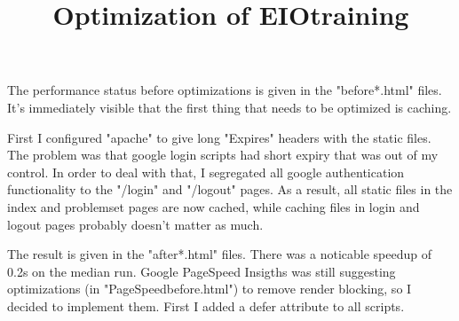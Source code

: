 \documentclass{article}
\begin{document}
\title{Optimization of EIOtraining}
\maketitle

The performance status before optimizations is given in the "before*.html" files. It's immediately visible that the first thing that needs to be optimized is caching.

First I configured "apache" to give long "Expires" headers with the static files. The problem was that google login scripts had short expiry that was out of my control. In order to deal with that, I segregated all google authentication functionality to the "/login" and "/logout" pages. As a result, all static files in the index and problemset pages are now cached, while caching files in login and logout pages probably doesn't matter as much.

The result is given in the "after*.html" files. There was a noticable speedup of 0.2s on the median run. Google PageSpeed Insigths was still suggesting optimizations (in "PageSpeedbefore.html") to remove render blocking, so I decided to implement them. First I added a defer attribute to all scripts.
\end{document}
